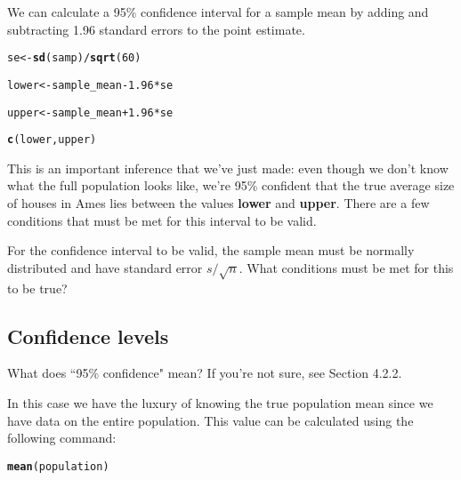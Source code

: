 \documentclass{article}\usepackage[]{graphicx}\usepackage[]{color}
\makeatletter
\newcommand{\hlnum}[1]{\textcolor[rgb]{0.686,0.059,0.569}{#1}}%
\newcommand{\hlopt}[1]{\textcolor[rgb]{0,0,0}{#1}}%
\newcommand{\hlstd}[1]{\textcolor[rgb]{0.345,0.345,0.345}{#1}}%
\newcommand{\hlkwb}[1]{\textcolor[rgb]{0.69,0.353,0.396}{#1}}%
\newcommand{\hlkwd}[1]{\textcolor[rgb]{0.737,0.353,0.396}{\textbf{#1}}}%
\newenvironment{kframe}{%
 \def\at@end@of@kframe{}%
 \ifinner\ifhmode%
  \def\at@end@of@kframe{\end{minipage}}%
  \begin{minipage}{\columnwidth}%
 \fi\fi%
 \def\FrameCommand##1{\hskip\@totalleftmargin \hskip-\fboxsep
 \colorbox{shadecolor}{##1}\hskip-\fboxsep
     \hskip-\linewidth \hskip-\@totalleftmargin \hskip\columnwidth}%
 \MakeFramed {\advance\hsize-\width
   \@totalleftmargin\z@ \linewidth\hsize
   \@setminipage}}%
 {\par\unskip\endMakeFramed%
 \at@end@of@kframe}
\newenvironment{knitrout}{}{} %
\makeatother
\begin{document}
We can calculate a 95\% confidence interval for a sample mean by adding and subtracting 1.96 standard errors to the point estimate.

\begin{knitrout}
\color{fgcolor}\begin{kframe}
\begin{alltt}
\hlstd{se} \hlkwb{<-} \hlkwd{sd}\hlstd{(samp)}\hlopt{/}\hlkwd{sqrt}\hlstd{(}\hlnum{60}\hlstd{)}

\hlstd{lower} \hlkwb{<-} \hlstd{sample_mean} \hlopt{-} \hlnum{1.96} \hlopt{*} \hlstd{se}

\hlstd{upper} \hlkwb{<-} \hlstd{sample_mean} \hlopt{+} \hlnum{1.96} \hlopt{*} \hlstd{se}

\hlkwd{c}\hlstd{(lower, upper)}
\end{alltt}
\end{kframe}
\end{knitrout}


This is an important inference that we've just made: even though we don't know what the full population looks like, we're 95\% confident that the true average size of houses in Ames lies between the values \hlkwd{lower} and \hlkwd{upper}. There are a few conditions that must be met for this interval to be valid.

\begin{exercise}
For the confidence interval to be valid, the sample mean must be normally distributed and have standard error $s / \sqrt{n}$. What conditions must be met for this to be true?
\end{exercise}

\subsection*{Confidence levels}

\begin{exercise}
What does ``95\% confidence" mean? If you're not sure, see Section 4.2.2.
\end{exercise}

In this case we have the luxury of knowing the true population mean since we have data on the entire population. This value can be calculated using the following command:

\begin{knitrout}
\color{fgcolor}\begin{kframe}
\begin{alltt}
\hlkwd{mean}\hlstd{(population)}
\end{alltt}
\end{kframe}
\end{knitrout}
\end{document}
